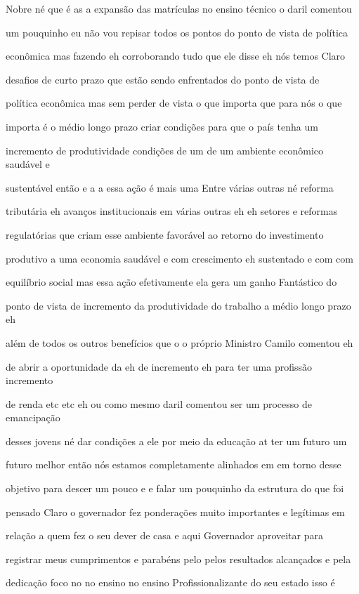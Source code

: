 \documentclass[a4paper,12pt]{article}
\begin{document}
Nobre né que é as a expansão das matrículas no ensino técnico o daril comentou

um pouquinho eu não vou repisar todos os pontos do ponto de vista de política

econômica mas fazendo eh corroborando tudo que ele disse eh nós temos Claro

desafios de curto prazo que estão sendo enfrentados do ponto de vista de

política econômica mas sem perder de vista o que importa que para nós o que

importa é o médio longo prazo criar condições para que o país tenha um

incremento de produtividade condições de um de um ambiente econômico saudável e

sustentável então e a a essa ação é mais uma Entre várias outras né reforma

tributária eh avanços institucionais em várias outras eh eh setores e reformas

regulatórias que criam esse ambiente favorável ao retorno do investimento

produtivo a uma economia saudável e com crescimento eh sustentado e com com

equilíbrio social mas essa ação efetivamente ela gera um ganho Fantástico do

ponto de vista de incremento da produtividade do trabalho a médio longo prazo eh

além de todos os outros benefícios que o o próprio Ministro Camilo comentou eh

de abrir a oportunidade da eh de incremento eh para ter uma profissão incremento

de renda etc etc eh ou como mesmo daril comentou ser um processo de emancipação

desses jovens né dar condições a ele por meio da educação at ter um futuro um

futuro melhor então nós estamos completamente alinhados em em torno desse

objetivo para descer um pouco e e falar um pouquinho da estrutura do que foi

pensado Claro o governador fez ponderações muito importantes e legítimas em

relação a quem fez o seu dever de casa e aqui Governador aproveitar para

registrar meus cumprimentos e parabéns pelo pelos resultados alcançados e pela

dedicação foco no no ensino no ensino Profissionalizante do seu estado isso é
\end{document}
